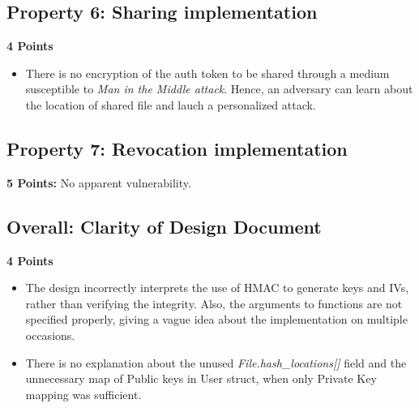 \documentclass[12pt]{article}
\begin{document}
\subsection*{Property 6: Sharing implementation}
\textbf{4 Points}

\begin{itemize}[wide=0pt, noitemsep]
	\itemsep0em
	\item There is no encryption of the auth token to be shared through a medium susceptible to \textit{Man in the Middle attack}. Hence, an adversary can learn about the location of shared file and lauch a personalized attack.
\end{itemize}

\subsection*{Property 7: Revocation implementation}
\textbf{5 Points:}  No apparent vulnerability.	

\subsection*{Overall: Clarity of Design Document}
\textbf{4 Points}

\begin{itemize}[wide=0pt, noitemsep]
	\itemsep0em
	\item The design incorrectly interprets the use of HMAC to generate keys and IVs, rather than verifying the integrity. Also, the arguments to functions are not specified properly, giving a vague idea about the implementation on multiple occasions.
	\item There is no explanation about the unused \textit{File.hash\_locations[]} field and the unnecessary map of Public keys in User struct, when only Private Key mapping was sufficient. 
\end{itemize}
\end{document}
